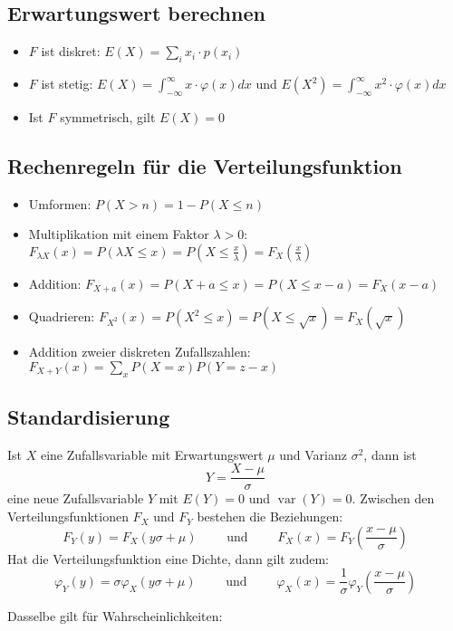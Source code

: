 \subsection{Erwartungswert berechnen}
\begin{itemize}
  \item $F$ ist diskret: $E(X) = \sum_i x_i \cdot p(x_i)$ %
  \item $F$ ist stetig: $E(X) = \int_{-\infty}^{\infty}x \cdot \varphi(x)dx$
    und $E(X^2) = \int_{-\infty}^{\infty}x^2 \cdot \varphi(x)dx$
  \item Ist $F$ symmetrisch, gilt $E(X) = 0$
\end{itemize}

\subsection{Rechenregeln für die Verteilungsfunktion}
\begin{itemize}
  \item Umformen: $P(X>n) = 1 - P(X \le n)$
  \item Multiplikation mit einem Faktor $\lambda > 0$: $F_{\lambda X}(x)=
    P(\lambda X \le x) = P(X \le \frac{x}{\lambda}) =
    F_X(\frac{x}{\lambda})$
  \item Addition: $F_{X+a}(x) = P(X+a \le x) = P(X \le x-a) = F_X(x-a)$
  \item Quadrieren: $F_{X^2}(x) = P(X^2 \le x) = P(X \le \sqrt{x}) =
    F_X(\sqrt{x})$
  \item Addition zweier diskreten Zufallszahlen:
    $F_{X+Y}(x) = \sum_x P(X=x)P(Y=z-x)$
\end{itemize}

\subsection{Standardisierung}
Ist $X$ eine Zufallsvariable mit Erwartungswert $\mu$ und Varianz
$\sigma^2$, dann ist
\[ Y = \frac{X-\mu}{\sigma} \]
eine neue Zufallsvariable $Y$ mit $E(Y) = 0$ und $\operatorname{var}(Y) = 0$.
Zwischen den Verteilungsfunktionen $F_X$ und $F_Y$ bestehen die
Beziehungen:
\[ F_Y(y) = F_X(y\sigma+\mu) \qquad \text{ und } \qquad
  F_X(x)=F_Y\left(\frac{x-\mu}{\sigma}\right) \]
Hat die Verteilungsfunktion eine Dichte, dann gilt zudem:
\[ \varphi_Y(y) = \sigma \varphi_X(y\sigma+\mu) \qquad \text{ und }
  \qquad \varphi_X(x) = \frac{1}{\sigma}
  \varphi_Y\left(\frac{x-\mu}\sigma\right) \]

Dasselbe gilt für Wahrscheinlichkeiten:


